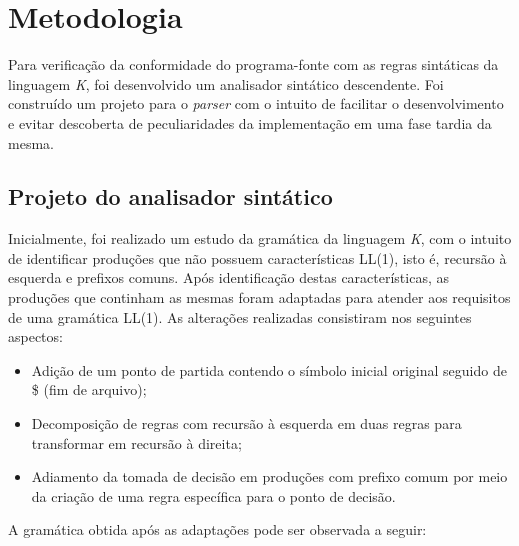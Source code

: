 \chapter[Metodologia]{Metodologia}
\label{cap:metodologia}

Para verificação da conformidade do programa-fonte com as regras sintáticas da linguagem \textit{K}, foi desenvolvido um analisador sintático descendente. Foi construído um projeto para o \textit{parser} com o intuito de facilitar o desenvolvimento e  evitar descoberta de peculiaridades da implementação em uma fase tardia da mesma.

\section{Projeto do analisador sintático}
\label{sec:metodologia_projeto}

Inicialmente, foi realizado um estudo da gramática da linguagem \textit{K}, com o intuito de identificar produções que não possuem características LL(1), isto é, recursão à esquerda e prefixos comuns. Após identificação destas características, as produções que continham as mesmas foram adaptadas para atender aos requisitos de uma gramática LL(1). As alterações realizadas consistiram nos seguintes aspectos:

\begin{itemize}
    \item Adição de um ponto de partida contendo o símbolo inicial original seguido de \$ (fim de arquivo);
    \item Decomposição de regras com recursão à esquerda em duas regras para transformar em recursão à direita;
    \item Adiamento da tomada de decisão em produções com prefixo comum por meio da criação de uma regra específica para o ponto de decisão.
\end{itemize}

A gramática obtida após as adaptações pode ser observada a seguir:

